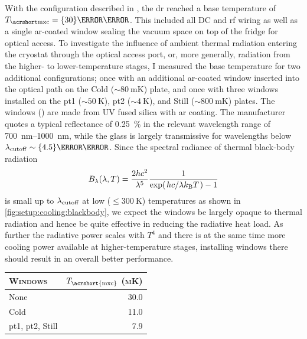 With the configuration described in , the \gls{dr} reached a base temperature of $\Tmxc = \qty{30}{\milli\kelvin}$.
This included all DC and \gls{rf} wiring as well as a single \gls{ar}-coated window sealing the vacuum space on top of the fridge for optical access.
To investigate the influence of ambient thermal radiation entering the cryostat through the optical access port, or, more generally, radiation from the higher- to lower-temperature stages, I measured the base temperature for two additional configurations; once with an additional \gls{ar}-coated window inserted into the optical path on the Cold ($\sim\qty{80}{\milli\kelvin}$) plate, and once with three windows installed on the \gls{pt1} ($\sim\qty{50}{\kelvin}$), \gls{pt2} ($\sim\qty{4}{\kelvin}$), and Still ($\sim\qty{800}{\milli\kelvin}$) plates.
The windows (\thewindow) are made from UV fused silica with \gls{ar} coating.
The manufacturer quotes a typical reflectance of \qty{0.25}{\percent} in the relevant wavelength range of \qtyrange{700}{1000}{\nano\meter}, while the glass is largely transmissive for wavelengths below $\lambda_{\mr{cutoff}}\sim\qty{4.5}{\micro\meter}$.
Since the spectral radiance of thermal black-body radiation~\cite{Planck1900}
\begin{equation}\label{eq:setup:cooling:blackbody}
    B_\lambda(\lambda, T) = \frac{2 h c^2}{\lambda^5}\frac{1}{\exp(\flatfrac{hc}{\lambda\kb T}) - 1}
\end{equation}
is small up to $\lambda_{\mathrm{cutoff}}$ at low ($\leq\qty{300}{\kelvin}$) temperatures as shown in \cref{fig:setup:cooling:blackbody}, we expect the windows be largely opaque to thermal radiation and hence be quite effective in reducing the radiative heat load.
As further the radiative power scales with $T^4$ and there is at the same time more cooling power available at higher-temperature stages, installing windows there should result in an overall better performance.

\begin{margintable}
    \centering
    \footnotesize
    \caption{
        \Gls{mxc} temperature for different configurations of \gls{ar} coated windows (\thewindow) inside the \gls{dr}.
    }
    \label{tab:setup:cooling:windows}
    \begin{tabular}{lr}
        \toprule
        \textsc{Windows}                      & $T_\mathrm{\acrshort{mxc}}$ \textsc{(mK)} \\
        \midrule
        None                                  & 30.0                                      \\
        Cold                                  & 11.0                                      \\
        \acrshort{pt1}, \acrshort{pt2}, Still & 7.9                                       \\
        \bottomrule
    \end{tabular}
\end{margintable}

